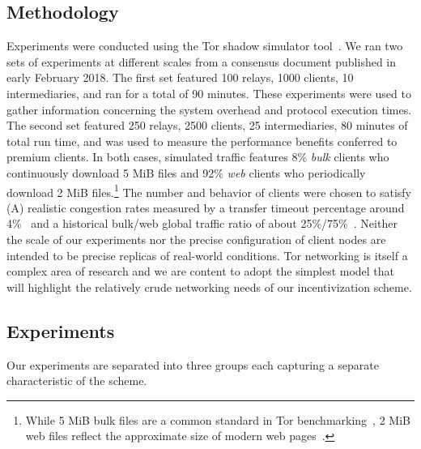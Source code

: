 \subsection{Methodology}
\label{subsec:methodology}


Experiments were conducted using the Tor shadow simulator
tool~\cite{jansen2011shadow, tracey2018high}. We ran two sets of experiments at
different scales from a consensus document published in early February 2018. The
first set featured 100 relays, 1000 clients, 10 intermediaries, and ran for a
total of 90 minutes. These experiments were used to gather information
concerning the system overhead and protocol execution times. The second set
featured 250 relays, 2500 clients, 25 intermediaries, 80 minutes of total run
time, and was used to measure the performance benefits conferred to premium
clients. In both cases, simulated traffic features 8\% \emph{bulk} clients who
continuously download 5 MiB files and 92\% \emph{web} clients who periodically
download 2 MiB files.\footnote{While 5 MiB bulk files are a common standard in
  Tor benchmarking~\cite{portal2018tormetrics}, 2 MiB web files reflect the
  approximate size of modern web pages~\cite{team2018httparchive}.} The number
and behavior of clients were chosen to satisfy (A) realistic congestion rates
measured by a transfer timeout percentage around 4\%~\cite{portal2018tormetrics}
and a historical bulk/web global traffic ratio of about
25\%/75\%~\cite{privcount-ccs2016, learning-ccs2018}. Neither the scale of our experiments nor the precise configuration of
client nodes are intended to be precise replicas of real-world conditions. Tor
networking is itself a complex area of research and we are content to adopt the
simplest model that will highlight the relatively crude networking needs of our
incentivization scheme.

\subsection{Experiments}
\label{subsec:experiments}
Our experiments are separated into three groups each capturing a separate
characteristic of the scheme.


